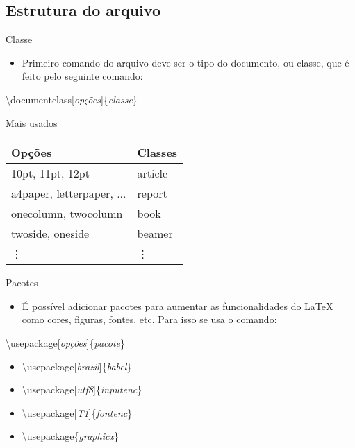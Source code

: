 \subsection{Estrutura do arquivo}

\begin{frame}[allowframebreaks]{Classe}
	\begin{itemize}
	\item Primeiro comando do arquivo deve ser o tipo do documento, ou classe, que é feito pelo seguinte comando:
	\end{itemize}

	\alert{\textbackslash documentclass[\textit{opções}]\{\textit{classe}\}}

	\vspace{.5cm}
	
	\begin{block}{Mais usados}
		\begin{center}
		\begin{tabular}{|l|l|}
		\hline
		{\bf Opções}				& {\bf Classes} \\
		\hline
		10pt, 11pt, 12pt			& article		\\
		a4paper, letterpaper, ...	& report		\\
		onecolumn, twocolumn		& book			\\
		twoside, oneside			& beamer		\\
		\vdots						& \vdots		\\
		\hline
		\end{tabular}
		\end{center}
	\end{block}
\end{frame}

\begin{frame}{Pacotes}
	\begin{itemize}
	\item É possível adicionar pacotes para aumentar as funcionalidades do \LaTeX\, como cores, figuras, fontes, etc. Para isso	se usa o comando:
	\end{itemize}

	\alert{\textbackslash usepackage[\textit{opções}]\{\textit{pacote}\}}

	\vspace{.5cm}

	\begin{example}
		\begin{itemize}
		\item \textbackslash usepackage[\textit{brazil}]\{\textit{babel}\}
		\item \textbackslash usepackage[\textit{utf8}]\{\textit{inputenc}\}
		\item \textbackslash usepackage[\textit{T1}]\{\textit{fontenc}\}
		\item \textbackslash usepackage\{\textit{graphicx}\}
		\end{itemize}
	\end{example}
\end{frame}

